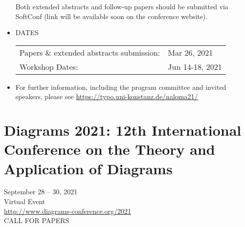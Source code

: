 \documentclass{article}
\begin{document}
\begin{itemize}
  Both extended abstracts and follow-up papers should be submitted via SoftConf (link will be available soon on the conference website). 
 
\item  DATES 
 
\begin{tabulary}{\linewidth}{LL}Papers \& extended abstracts submission:  & Mar 26, 2021 \\
Workshop Dates:  & Jun 14-18, 2021 \\
\end{tabulary}
 
\item  For further information, including the program committee and invited speakers, please see \href{https://typo.uni-konstanz.de/naloma21/}{https://typo.uni-konstanz.de/naloma21/} 
 
\end{itemize}\section{Diagrams 2021: 12th International Conference on the Theory and Application of Diagrams}\label{Diagrams2021}  September 28 – 30, 2021\\ 
  Virtual Event\\ 
  \href{http://www.diagrams-conference.org/2021}{http://www.diagrams-conference.org/2021}\\ 
CALL FOR PAPERS 
\end{document}
